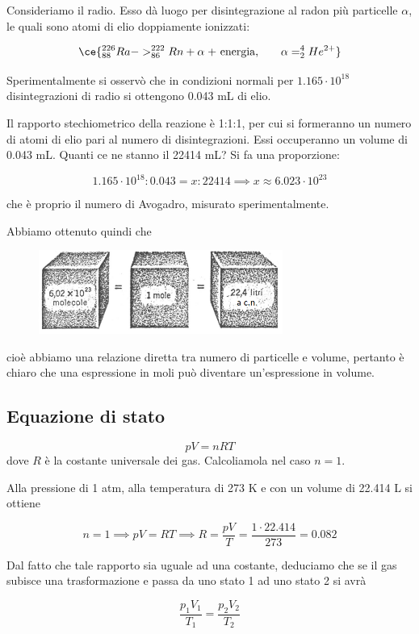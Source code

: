Consideriamo il radio. Esso dà luogo per disintegrazione al radon più particelle $\alpha$, le quali sono atomi di elio doppiamente ionizzati:

$$\ce{^{226}_{88}Ra -> ^{222}_{86}Rn + \alpha \; \text{+ energia,} \qquad \alpha= ^{4}_{2}He^{2+}}$$

Sperimentalmente si osservò che in condizioni normali per $1.165 \cdot 10^{18}$ disintegrazioni di radio si ottengono 0.043 mL di elio.

Il rapporto stechiometrico della reazione è 1:1:1, per cui si formeranno un numero di atomi di elio pari al numero di disintegrazioni. Essi occuperanno un volume di 0.043 mL. Quanti ce ne stanno il 22414 mL? Si fa una proporzione:

$$1.165 \cdot 10^{18}:0.043=x:22414 \implies x \approx 6.023 \cdot 10^{23}$$

che è proprio il numero di Avogadro, misurato sperimentalmente.

Abbiamo ottenuto quindi che

\begin{figure}[htp]
    \centering
    \includegraphics[width=8cm]{immagini/legge_di_avogadro.png}
\end{figure}

cioè abbiamo una relazione diretta tra numero di particelle e volume, pertanto è chiaro che una espressione in moli può diventare un'espressione in volume.
\subsection{Equazione di stato}
$$pV=nRT$$
dove $R$ è la costante universale dei gas. Calcoliamola nel caso $n=1$.

Alla pressione di 1 atm, alla temperatura di 273 K e con un volume di 22.414 L si ottiene

$$n=1 \implies pV=RT \implies R=\frac{pV}{T}=\frac{1 \cdot 22.414}{273}=0.082$$

Dal fatto che tale rapporto sia uguale ad una costante, deduciamo che se il gas subisce una trasformazione e passa da uno stato 1 ad uno stato 2 si avrà

$$\frac{p_1V_1}{T_1}=\frac{p_2V_2}{T_2}$$

